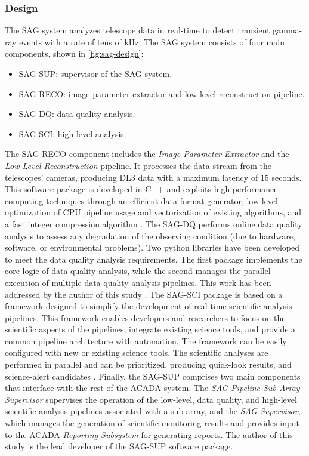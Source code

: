 \subsubsection{Design}
The SAG system analyzes telescope data in real-time to detect transient gamma-ray events with a rate of tens of kHz. The SAG system consists of four main components, shown in \autoref{fig:sag-design}:
\begin{itemize}
    \item SAG-SUP: supervisor of the SAG system.
    \item SAG-RECO: image parameter extractor and low-level reconstruction pipeline.
    \item SAG-DQ: data quality analysis.
    \item SAG-SCI: high-level analysis.
\end{itemize}
The SAG-RECO component includes the \textit{Image Parameter Extractor} and the \textit{Low-Level Reconstruction} pipeline. It processes the data stream from the telescopes' cameras, producing DL3 data with a maximum latency of 15 seconds. This software package is developed in C++ and exploits high-performance computing techniques through an efficient data format generator, low-level optimization of CPU pipeline usage and vectorization of existing algorithms, and a fast integer compression algorithm \cite{aubert_2018}. The SAG-DQ performs online data quality analysis to assess any degradation of the observing condition (due to hardware, software, or environmental problems). Two python libraries have been developed to meet the data quality analysis requirements. The first package implements the core logic of data quality analysis, while the second manages the parallel execution of multiple data quality analysis pipelines. This work has been addressed by the author of this study \cite{Baroncelli_2022}. 
The SAG-SCI package is based on a framework designed to simplify the development of real-time scientific analysis pipelines. This framework enables developers and researchers to focus on the scientific aspects of the pipelines, integrate existing science tools, and provide a common pipeline architecture with automation. The framework can be easily configured with new or existing science tools. The scientific analyses are performed in parallel and can be prioritized, producing quick-look results, and science-alert candidates \cite{Parmiggiani_2022}. Finally, the SAG-SUP comprises two main components that interface with the rest of the ACADA system. The \textit{SAG Pipeline Sub-Array Supervisor} supervises the operation of the low-level, data quality, and high-level scientific analysis pipelines associated with a sub-array, and the \textit{SAG Supervisor}, which manages the generation of scientific monitoring results and provides input to the ACADA \textit{Reporting Subsystem} for generating reports. The author of this study is the lead developer of the SAG-SUP software package.
